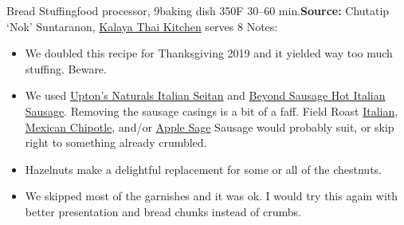 \begin{recipe}{Bread Stuffing}{food processor, 9\inch{}\inch baking dish \hfill 350\0F \hfill 30--60 min.}{\textbf{Source:} Chutatip `Nok' Suntaranon, \href{https://www.kalaya.net/}{Kalaya Thai Kitchen} \hfill serves 8}
 \freeform Notes:
 \begin{itemize}
  \item We doubled this recipe for Thanksgiving 2019 and it yielded way too much stuffing. Beware.
  \item We used \href{https://www.uptonsnaturals.com/products/italian-seitan}{Upton's Naturals Italian Seitan} and \href{https://www.beyondmeat.com/products/hot-italian/}{Beyond Sausage Hot Italian Sausage}. Removing the sausage casings is a bit of a faff. Field Roast \href{https://fieldroast.com/product/italian-sausage/}{Italian}, \href{https://fieldroast.com/product/mexican-chipotle-sausage/}{Mexican Chipotle}, and/or \href{https://fieldroast.com/product/smoked-apple-sage-sausage/}{Apple Sage} Sausage would probably suit, or skip right to something already crumbled.
  \item Hazelnuts make a delightful replacement for some or all of the chestnuts.
  \item We skipped most of the garnishes and it was ok. I would try this again with better presentation and bread chunks instead of crumbs.
 \end{itemize}
\end{recipe}


